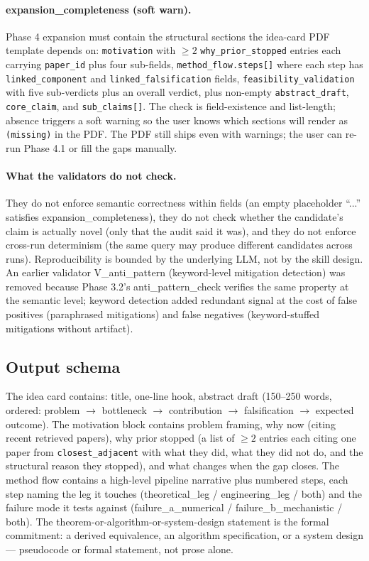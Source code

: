 \documentclass[10pt,a4paper]{article}
\begin{document}
\paragraph{expansion\_completeness (soft warn).} Phase 4 expansion must contain the structural sections the idea-card PDF template depends on: \texttt{motivation} with $\geq 2$ \texttt{why\_prior\_stopped} entries each carrying \texttt{paper\_id} plus four sub-fields, \texttt{method\_flow.steps[]} where each step has \texttt{linked\_component} and \texttt{linked\_falsification} fields, \texttt{feasibility\_validation} with five sub-verdicts plus an overall verdict, plus non-empty \texttt{abstract\_draft}, \texttt{core\_claim}, and \texttt{sub\_claims[]}. The check is field-existence and list-length; absence triggers a soft warning so the user knows which sections will render as \texttt{(missing)} in the PDF. The PDF still ships even with warnings; the user can re-run Phase 4.1 or fill the gaps manually.

\paragraph{What the validators do not check.} They do not enforce semantic correctness within fields (an empty placeholder ``...'' satisfies expansion\_completeness), they do not check whether the candidate's claim is actually novel (only that the audit said it was), and they do not enforce cross-run determinism (the same query may produce different candidates across runs). Reproducibility is bounded by the underlying LLM, not by the skill design. An earlier validator V\_anti\_pattern (keyword-level mitigation detection) was removed because Phase 3.2's anti\_pattern\_check verifies the same property at the semantic level; keyword detection added redundant signal at the cost of false positives (paraphrased mitigations) and false negatives (keyword-stuffed mitigations without artifact).

\subsection{Output schema}
\label{subsec:skill-schema}

The idea card contains: title, one-line hook, abstract draft (150--250 words, ordered: problem $\to$ bottleneck $\to$ contribution $\to$ falsification $\to$ expected outcome). The motivation block contains problem framing, why now (citing recent retrieved papers), why prior stopped (a list of $\geq 2$ entries each citing one paper from \texttt{closest\_adjacent} with what they did, what they did not do, and the structural reason they stopped), and what changes when the gap closes. The method flow contains a high-level pipeline narrative plus numbered steps, each step naming the leg it touches (theoretical\_leg / engineering\_leg / both) and the failure mode it tests against (failure\_a\_numerical / failure\_b\_mechanistic / both). The theorem-or-algorithm-or-system-design statement is the formal commitment: a derived equivalence, an algorithm specification, or a system design --- pseudocode or formal statement, not prose alone.
\end{document}

